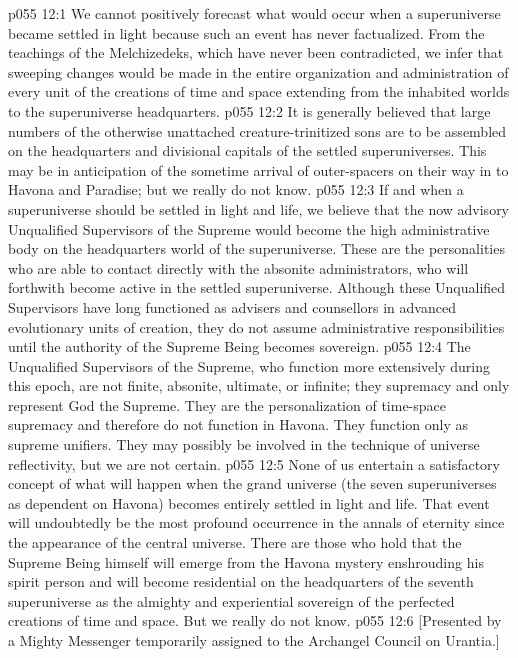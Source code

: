 \vs p055 12:1 We cannot positively forecast what would occur when a superuniverse became settled in light because such an event has never factualized. From the teachings of the Melchizedeks, which have never been contradicted, we infer that sweeping changes would be made in the entire organization and administration of every unit of the creations of time and space extending from the inhabited worlds to the superuniverse headquarters.
\vs p055 12:2 It is generally believed that large numbers of the otherwise unattached creature\hyp{}trinitized sons are to be assembled on the headquarters and divisional capitals of the settled superuniverses. This may be in anticipation of the sometime arrival of outer\hyp{}spacers on their way in to Havona and Paradise; but we really do not know.
\vs p055 12:3 \pc If and when a superuniverse should be settled in light and life, we believe that the now advisory Unqualified Supervisors of the Supreme would become the high administrative body on the headquarters world of the superuniverse. These are the personalities who are able to contact directly with the absonite administrators, who will forthwith become active in the settled superuniverse. Although these Unqualified Supervisors have long functioned as advisers and counsellors in advanced evolutionary units of creation, they do not assume administrative responsibilities until the authority of the Supreme Being becomes sovereign.
\vs p055 12:4 The Unqualified Supervisors of the Supreme, who function more extensively during this epoch, are not finite, absonite, ultimate, or infinite; they  supremacy and only represent God the Supreme. They are the personalization of time\hyp{}space supremacy and therefore do not function in Havona. They function only as supreme unifiers. They may possibly be involved in the technique of universe reflectivity, but we are not certain.
\vs p055 12:5 \pc None of us entertain a satisfactory concept of what will happen when the grand universe (the seven superuniverses as dependent on Havona) becomes entirely settled in light and life. That event will undoubtedly be the most profound occurrence in the annals of eternity since the appearance of the central universe. There are those who hold that the Supreme Being himself will emerge from the Havona mystery enshrouding his spirit person and will become residential on the headquarters of the seventh superuniverse as the almighty and experiential sovereign of the perfected creations of time and space. But we really do not know.
\vsetoff
\vs p055 12:6 [Presented by a Mighty Messenger temporarily assigned to the Archangel Council on Urantia.]
\quizlink
